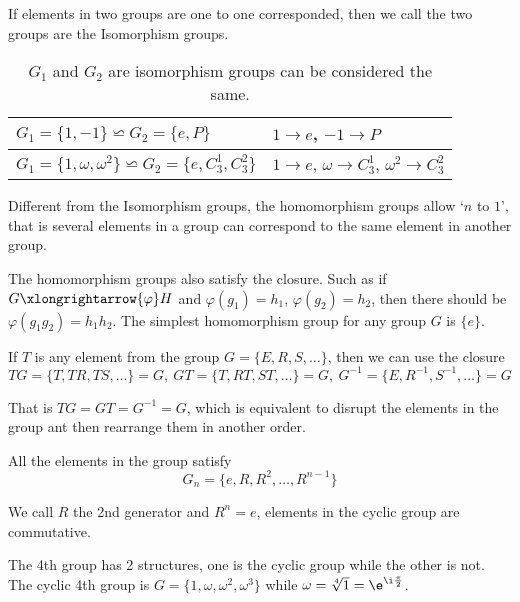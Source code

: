\begin{definition}
    If elements in two groups are one to one corresponded, then we call the two groups are the Isomorphism groups.
\end{definition}

\begin{table}[!ht]
    \centering
    \caption{$G_1$ and $G_2$ are isomorphism groups can be considered the same.}
    \begin{tabular}{ l | l }
        \toprule
        $G_1=\{1,-1\}\backsimeq G_2=\{e,P\}$ & $1\to e$, $-1\to P$\\
        \midrule
        $G_1=\{1,\omega,\omega^2\}\backsimeq G_2=\{e,C_3^1,C_3^2\}$ & $1\to e$, $\omega\to C_3^1$, $\omega^2\to C_3^2$\\
        \bottomrule
    \end{tabular}
\end{table}

\begin{definition}
    Different from the Isomorphism groups, the homomorphism groups allow `$n$ to $1$', that is several elements in a group can correspond to the same element in another group.
\end{definition}

The homomorphism groups also satisfy the closure. Such as if $G\xlongrightarrow{\varphi}H$ and $\varphi(g_1)=h_1$, $\varphi(g_2)=h_2$, then there should be $\varphi(g_1g_2)=h_1h_2$. The simplest homomorphism group for any group $G$ is $\{e\}$.

\begin{theorem}
    If $T$ is any element from the group $G=\{E,R,S,\ldots\}$, then we can use the closure
    \[TG=\{T,TR,TS,\ldots\}=G,\ GT=\{T,RT,ST,\ldots\}=G,\ G^{-1}=\{E,R^{-1},S^{-1},\ldots\}=G\]

    That is $TG=GT=G^{-1}=G$, which is equivalent to disrupt the elements in the group ant then rearrange them in another order.
\end{theorem}

\begin{definition}
    All the elements in the group satisfy
    \[G_n=\{e,R,R^2,\ldots,R^{n-1}\}\]

    We call $R$ the 2nd generator and $R^n=e$, elements in the cyclic group are commutative.
\end{definition}

The 4th group has 2 structures, one is the cyclic group while the other is not. The cyclic 4th group is $G=\{1,\omega,\omega^2,\omega^3\}$ while $\omega=\sqrt[4]1=\e^{\i\frac\pi2}$.

